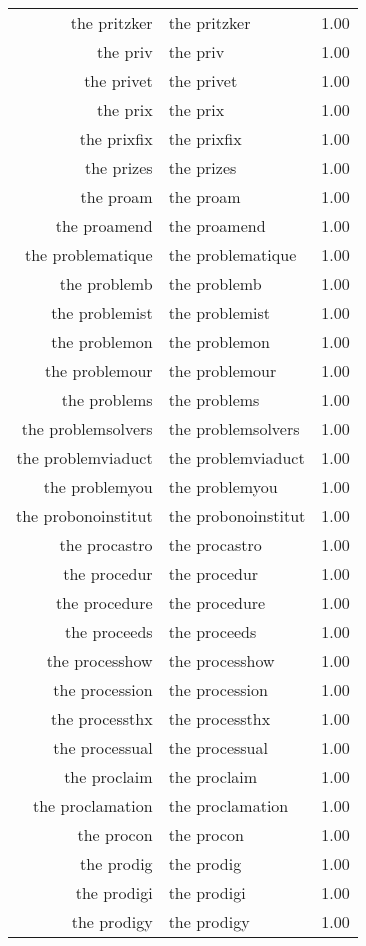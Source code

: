 \begin{table}[ht]
\begin{tabular}{rlr}
  the pritzker & the pritzker & 1.00 \\ 
  the priv & the priv & 1.00 \\ 
  the privet & the privet & 1.00 \\ 
  the prix & the prix & 1.00 \\ 
  the prixfix & the prixfix & 1.00 \\ 
  the prizes & the prizes & 1.00 \\ 
  the proam & the proam & 1.00 \\ 
  the proamend & the proamend & 1.00 \\ 
  the problematique & the problematique & 1.00 \\ 
  the problemb & the problemb & 1.00 \\ 
  the problemist & the problemist & 1.00 \\ 
  the problemon & the problemon & 1.00 \\ 
  the problemour & the problemour & 1.00 \\ 
  the problems & the problems & 1.00 \\ 
  the problemsolvers & the problemsolvers & 1.00 \\ 
  the problemviaduct & the problemviaduct & 1.00 \\ 
  the problemyou & the problemyou & 1.00 \\ 
  the probonoinstitut & the probonoinstitut & 1.00 \\ 
  the procastro & the procastro & 1.00 \\ 
  the procedur & the procedur & 1.00 \\ 
  the procedure & the procedure & 1.00 \\ 
  the proceeds & the proceeds & 1.00 \\ 
  the processhow & the processhow & 1.00 \\ 
  the procession & the procession & 1.00 \\ 
  the processthx & the processthx & 1.00 \\ 
  the processual & the processual & 1.00 \\ 
  the proclaim & the proclaim & 1.00 \\ 
  the proclamation & the proclamation & 1.00 \\ 
  the procon & the procon & 1.00 \\ 
  the prodig & the prodig & 1.00 \\ 
  the prodigi & the prodigi & 1.00 \\ 
  the prodigy & the prodigy & 1.00 \\ 

\end{tabular}
\end{table}
